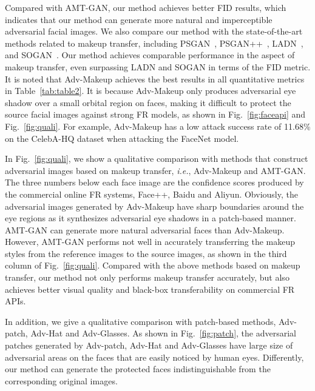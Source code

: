 \documentclass[10pt,journal,compsoc]{IEEEtran}
\begin{document}
Compared with AMT-GAN, our method achieves better FID results, which indicates that our method can generate more natural and imperceptible adversarial facial images. We also compare our method with the state-of-the-art methods related to makeup transfer, including PSGAN~\cite{jiang2020psgan}, PSGAN++~\cite{liu2021psgan++}, LADN~\cite{gu2019ladn}, and SOGAN~\cite{lyu2021sogan}. Our method achieves comparable performance in the aspect of makeup transfer, even surpassing LADN and SOGAN in terms of the FID metric. It is noted that Adv-Makeup achieves the best results in all quantitative metrics in Table~\ref{tab:table2}. It is because Adv-Makeup only produces adversarial eye shadow over a small orbital region on faces, making it difficult to protect the source facial images against strong FR models, as shown in Fig.~\ref{fig:faceapi} and Fig.~\ref{fig:quali}. For example, Adv-Makeup has a low attack success rate of 11.68\% on the CelebA-HQ dataset when attacking the FaceNet model.

In Fig.~\ref{fig:quali}, we show a qualitative comparison with methods that construct adversarial images based on makeup transfer, \emph{i.e.}, Adv-Makeup and AMT-GAN. The three numbers below each face image are the confidence scores produced by the commercial online FR systems, Face++, Baidu and Aliyun. Obviously, the adversarial images generated by Adv-Makeup have sharp boundaries around the eye regions as it synthesizes adversarial eye shadows in a patch-based manner. 
AMT-GAN can generate more natural adversarial faces than Adv-Makeup. However, AMT-GAN performs not well in accurately transferring the makeup styles from the reference images to the source images, as shown in the third column of Fig.~\ref{fig:quali}. Compared with the above methods based on makeup transfer, our method not only performs makeup transfer accurately, but also achieves better visual quality and black-box transferability on commercial FR APIs. 

In addition, we give a qualitative comparison with patch-based methods, Adv-patch, Adv-Hat and Adv-Glasses. As shown in Fig.~\ref{fig:patch}, the adversarial patches generated by Adv-patch, Adv-Hat and Adv-Glasses have large size of adversarial areas on the faces that are easily noticed by human eyes. Differently, our method can generate the protected faces indistinguishable from the corresponding original images.
\end{document}
